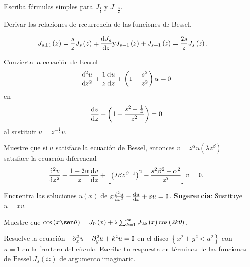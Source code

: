 \question

Escriba fórmulas simples para $J_{\frac{3}{2}}$ y $J_{-\frac{3}{2}}$.

\question

Derivar las relaciones de recurrencia de las funciones de Bessel.

\begin{align*}
	J_{s\pm 1}\left(z\right) & =
	\frac{s}{z}J_{s}\left(z\right)\mp
	\diff{J_{s}}{z}
	\text{y}
	J_{s-1}\left(z\right)+
	J_{s+1}\left(z\right)=
	\frac{2s}{z}J_{s}\left(z\right).
\end{align*}

\question

Convierta la ecuación de Bessel
\begin{equation*}
	\diff[2]{u}{z}+
	\frac{1}{z}\diff{u}{z}+
	\left(1-\frac{s^{2}}{z^{2}}\right)u=
	0
\end{equation*}
en
\begin{equation*}
	\diff{v}{z}+
	\left(1-\frac{s^{2}-\frac{1}{4}}{z^{2}}\right)=
	0
\end{equation*}
al sustituir $u=z^{-\frac{1}{2}}v$.

\question

Muestre que si $u$ satisface la ecuación de Bessel, entonces
$v=z^{\alpha}u\left(\lambda z^{\beta}\right)$ satisface la ecuación
diferencial
\begin{equation*}
	\diff[2]{v}{z}+
	\frac{1-2\alpha}{z}
	\diff{v}{z}+
	\left[
		\left(\lambda\beta z^{\beta-1}\right)^{2}-
		\frac{s^{2}\beta^{2}-\alpha^{2}}{z^{2}}
		\right]v=0.
\end{equation*}

\question

Encuentra las soluciones $u\left(x\right)$ de
\begin{math}
	x\diff[2]{u}{x}-\diff{u}{x}+xu=0
\end{math}.
\textbf{Sugerencia}: Sustituye $u=xv$.

\question

Muestre que
\begin{math}
	\cos\left(x\sen\theta\right)=
	J_{0}\left(x\right)+2
	\sum_{k=1}^{\infty}
	J_{2k}\left(x\right)
	\cos\left(2k\theta\right)
\end{math}.

\question

Resuelve la ecuación
\begin{math}
	-\difcp[2]{u}{x}-
	\difcp[2]{u}{y}+
	k^{2}u=0
\end{math}
en el disco
\begin{math}
	\left\{
	x^{2}+y^{2}<
	a^{2}
	\right\}
\end{math}
con $u=1$ en la frontera del círculo.
Escribe tu respuesta en términos de las funciones de Bessel
$J_{s}\left(iz\right)$ de argumento imaginario.

